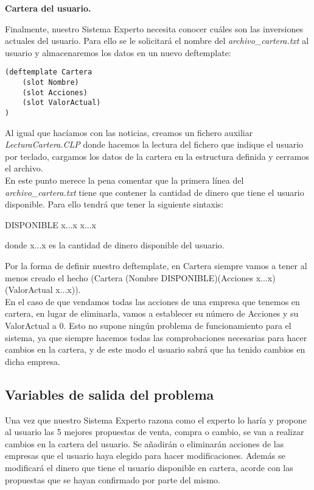 \documentclass[12pt]{article}
\begin{document}
\begin{center}
	\textbf{Cartera del usuario.}
\end{center}
Finalmente, nuestro Sistema Experto necesita conocer cuáles son las inversiones actuales del usuario. Para ello se le solicitará el nombre del \textit{archivo\_cartera.txt} al usuario y almacenaremos los datos en un nuevo deftemplate:
\begin{lstlisting}
(deftemplate Cartera
	(slot Nombre)
	(slot Acciones)
	(slot ValorActual)
)
\end{lstlisting}
Al igual que hacíamos con las noticias, creamos un fichero auxiliar \textit{LecturaCartera.CLP} donde hacemos la lectura del fichero que indique el usuario por teclado, cargamos los datos de la cartera en la estructura definida y cerramos el archivo.\\

En este punto merece la pena comentar que la primera línea del \textit{archivo\_cartera.txt} tiene que contener la cantidad de dinero que tiene el usuario disponible. Para ello tendrá que tener la siguiente sintaxis: 
\begin{center}
	DISPONIBLE x...x x...x\\
\end{center}
donde x...x es la cantidad de dinero disponible del usuario. 

Por la forma de definir nuestro deftemplate, en Cartera siempre vamos a tener al menos creado el hecho (Cartera (Nombre DISPONIBLE)(Acciones x...x)(ValorActual x...x)). \\

En el caso de que vendamos todas las acciones de una empresa que tenemos en cartera, en lugar de eliminarla, vamos a establecer su número de Acciones y su ValorActual a 0. Esto no supone ningún problema de funcionamiento para el sistema, ya que siempre hacemos todas las comprobaciones necesarias para hacer cambios en la cartera, y de este modo el usuario sabrá que ha tenido cambios en dicha empresa. 



\subsection{Variables de salida del problema}
Una vez que nuestro Sistema Experto razona como el experto lo haría y propone al usuario las 5 mejores propuestas de venta, compra o cambio, se van a realizar cambios en la cartera del usuario. Se añadirán o eliminarán acciones de las empresas que el usuario haya elegido para hacer modificaciones. Además se modificará el dinero que tiene el usuario disponible en cartera, acorde con las propuestas que se hayan confirmado por parte del mismo. \\
\end{document}
